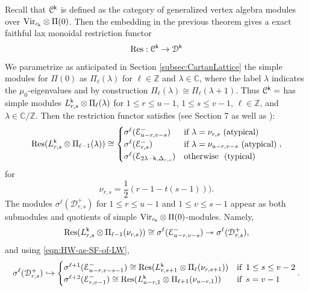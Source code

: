 \documentclass[a4paper, reqno]{amsart}
\theoremstyle{introTheorems}
\def\CC{\mathbb{C}}
\def\ZZ{\mathbb{Z}}
\newcommand\cC{\mathcal{C}}
\newcommand\cD{\mathcal{D}}
\newcommand\cE{\mathcal{E}}
\newcommand{\Res}{\textup{Res}}
\newcommand\Vir{\textup{Vir}}
\renewcommand{\1}{\mathbbold{1}}
\begin{document}
Recall that $\cC^\k$ is defined as the category of generalized vertex algebra modules over $\Vir_{c_\k} \otimes \Pi(0)$. Then the embedding in the previous theorem gives a exact faithful lax monoidal restriction functor 
\[
\Res: \cC^\k \rightarrow  \cD^\k
\]
We parametrize as anticipated in Section \ref{subsec:CartanLattice} the simple modules for $\Pi(0)$ as $\Pi_\ell(\lambda)$
for $\ell \in \ZZ$ and $\lambda \in \CC$, where the label $\lambda$ indicates the $\mu_0$-eigenvalues and by construction $\Pi_\ell(\lambda) \cong \Pi_\ell(\lambda+1)$.
Thus $\cC^\k=$ has simple modules $L^{\mathsf{k}}_{r,s} \otimes \Pi_\ell(\lambda)$
for $1\leq r \leq u-1$, $1\leq s \leq v-1$, $\ell \in \ZZ$, and $\lambda \in \mathbb C/\mathbb Z$. Then the restriction functor satisfies (see \cite{A} Section 7 as well as \cite{CMY1}):
\begin{equation}\label{eqn:FF-affine-sl2-correspondence}
    \Res(\VirPhi_{r,s} \otimes \Pi_{\ell -1}(\lambda)) \cong  \begin{cases}
    \sigma^\ell(\cE^-_{u-r, v-s}) & \text{if}\,\, \lambda = \nu_{r, s} \ \text{(atypical)} \\
    \sigma^\ell(\cE^-_{r, s}) & \text{if}\,\,\lambda = \nu_{u-r, v-s} \ \text{(atypical)}\\
    \sigma^\ell(\cE_{2\lambda-\k, \Delta_{r, s}}) & \text{otherwise \ (typical)} \\
\end{cases} , 
\end{equation}
for 
\[
\nu_{r, s} = \frac{1}{2}(r-1-t(s-1))).
\]
The modules $\sigma^\ell(\cD^+_{r, s})$ for $1\leq r\leq u-1$ and $1\leq v\leq s-1$ appear as both submodules and quotients of simple $\Vir_{c_\k} \otimes \Pi(0)$-modules. Namely, 
\begin{equation*}
       \Res(\VirPhi_{r,s} \otimes \Pi_{\ell -1}(\nu_{r, s})) \cong \sigma^\ell(\cE^-_{u-r, v-s}) \twoheadrightarrow \sigma^\ell(\cD^+_{r, s}),
\end{equation*} 
and using \eqref{eqn:HW-as-SF-of-LW},
\begin{equation*}
\sigma^\ell(\cD^+_{r, s}) \hookrightarrow \begin{cases}
    \sigma^{\ell+1}(\cE^-_{u-r, v-s -1}) \cong \Res(\VirPhi_{r,s+1} \otimes \Pi_{\ell}(\nu_{r, s+1})) & \text{if}\,\,\,1\leq s \leq v-2 \\
    \sigma^{\ell+2}(\cE^-_{r, v-1}) \cong \Res(\VirPhi_{u-r,1} \otimes \Pi_{\ell+1}(\nu_{u-r, 1})) & \text{if}\,\,\,s = v-1 \\
\end{cases} .
\end{equation*}
\end{document}
